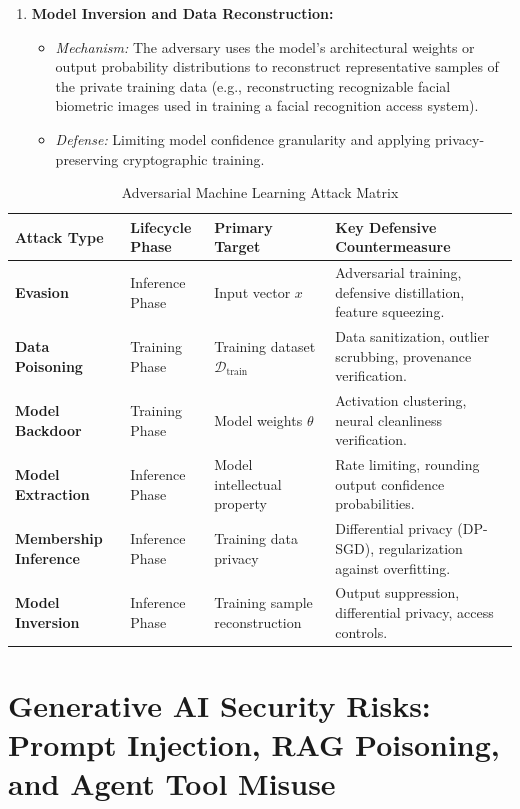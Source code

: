 \begin{enumerate}
\item \textbf{Model Inversion and Data Reconstruction:}
\begin{itemize}
\item \textit{Mechanism:} The adversary uses the model's architectural weights or output probability distributions to reconstruct representative samples of the private training data (e.g., reconstructing recognizable facial biometric images used in training a facial recognition access system).
\item \textit{Defense:} Limiting model confidence granularity and applying privacy-preserving cryptographic training.
\end{itemize}
\end{enumerate}

\begin{table}[htbp]
\centering
\caption{Adversarial Machine Learning Attack Matrix}
\label{tab:adversarial_ml_attacks}
\begin{tabularx}{\textwidth}{p{2.8cm} p{2.2cm} p{3.2cm} X}
\toprule
\textbf{Attack Type} & \textbf{Lifecycle Phase} & \textbf{Primary Target} & \textbf{Key Defensive Countermeasure} \\
\midrule
\textbf{Evasion} & Inference Phase & Input vector $x$ & Adversarial training, defensive distillation, feature squeezing. \\
\textbf{Data Poisoning} & Training Phase & Training dataset $\mathcal{D}_{\text{train}}$ & Data sanitization, outlier scrubbing, provenance verification. \\
\textbf{Model Backdoor} & Training Phase & Model weights $\theta$ & Activation clustering, neural cleanliness verification. \\
\textbf{Model Extraction} & Inference Phase & Model intellectual property & Rate limiting, rounding output confidence probabilities. \\
\textbf{Membership Inference} & Inference Phase & Training data privacy & Differential privacy (DP-SGD), regularization against overfitting. \\
\textbf{Model Inversion} & Inference Phase & Training sample reconstruction & Output suppression, differential privacy, access controls. \\
\bottomrule
\end{tabularx}
\end{table}

\newpage
\section{Generative AI Security Risks: Prompt Injection, RAG Poisoning, and Agent Tool Misuse}

